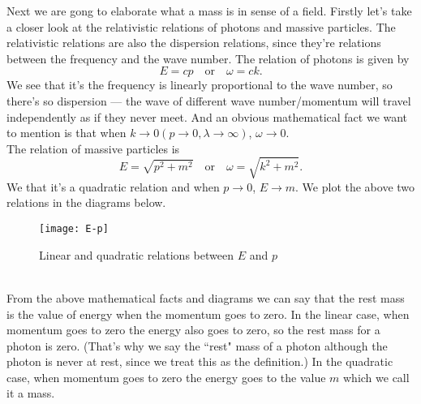 \documentclass{article}
\newcommand{\be}{\begin{equation}}
\newcommand{\ee}{\end{equation}}
\renewcommand{\1}{\left}
\renewcommand{\2}{\right}
\begin{document}
Next we are gong to elaborate what a mass is in sense of a field. Firstly let's take a closer look at the relativistic relations of photons and massive particles. The relativistic relations are also the dispersion relations, since they're relations between the frequency and the wave number. The relation of photons is given by
\be E=cp \quad\text{or}\quad \omega=ck. \ee
We see that it's the frequency is linearly proportional to the wave number, so there's so dispersion --- the wave of different wave number/momentum will travel independently as if they never meet. And an obvious mathematical fact we want to mention is that when $k \rightarrow 0 (p \rightarrow 0, \lambda \rightarrow \infty)$, $\omega \rightarrow 0$.\\
The relation of massive particles is
\be E=\sqrt{p^2+m^2} \quad\text{or}\quad \omega=\sqrt{k^2+m^2}. \ee
We that it's a quadratic relation and when $p\rightarrow 0$, $E\rightarrow m$. We plot the above two relations in the diagrams below.
\begin{figure}[h]
\centering
\texttt{[image: E-p]}
\caption{Linear and quadratic relations between $E$ and $p$}
\end{figure}\\

From the above mathematical facts and diagrams we can say that the rest mass is  the value of energy when the momentum goes to zero. In the linear case, when momentum goes to zero the energy also goes to zero, so the rest mass for a photon is zero. (That's why we say the ``rest" mass of a photon although the photon is never at rest, since we treat this as the definition.) In the quadratic case, when momentum goes to zero the energy goes to the value $m$ which we call it a mass.\\
\end{document}
